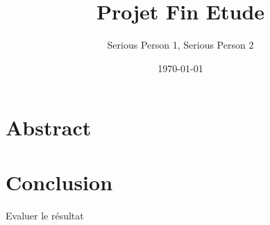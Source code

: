\documentclass[
 a4paper,
12pt,			%
headsepline
]{report}
\title{Projet Fin Etude}
\author{Serious Person 1, Serious Person 2}
\date{\today}
\begin{document}
	
\maketitle


\chapter*{Abstract} 




\tableofcontents %

\listoffigures %

	

	




\chapter{Conclusion}
Evaluer le résultat 


\printbibliography[heading=bibintoc]
\end{document}
